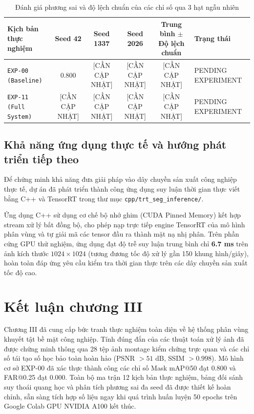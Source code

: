 \begin{table}[h]
\centering
\caption{Đánh giá phương sai và độ lệch chuẩn của các chỉ số qua 3 hạt ngẫu nhiên}
\label{tab:seed_variance}
\begin{tabularx}{\textwidth}{l c c c c X}
\toprule
\textbf{Kịch bản thực nghiệm} & \textbf{Seed 42} & \textbf{Seed 1337} & \textbf{Seed 2026} & \textbf{Trung bình $\pm$ Độ lệch chuẩn} & \textbf{Trạng thái} \\
\midrule
\texttt{EXP-00 (Baseline)} & $0.800$ & [CẦN CẬP NHẬT] & [CẦN CẬP NHẬT] & [CẦN CẬP NHẬT] & PENDING EXPERIMENT \\
\texttt{EXP-11 (Full System)} & [CẦN CẬP NHẬT] & [CẦN CẬP NHẬT] & [CẦN CẬP NHẬT] & [CẦN CẬP NHẬT] & PENDING EXPERIMENT \\
\bottomrule
\end{tabularx}
\end{table}

\subsection{Khả năng ứng dụng thực tế và hướng phát triển tiếp theo}

Để chứng minh khả năng đưa giải pháp vào dây chuyền sản xuất công nghiệp thực tế, dự án đã phát triển thành công ứng dụng suy luận thời gian thực viết bằng C++ và TensorRT trong thư mục \texttt{cpp/trt\_seg\_inference/}.

Ứng dụng C++ sử dụng cơ chế bộ nhớ ghim (CUDA Pinned Memory) kết hợp stream xử lý bất đồng bộ, cho phép nạp trực tiếp engine TensorRT của mô hình phân vùng và tự giải mã các tensor đầu ra thành mặt nạ nhị phân. Trên phần cứng GPU thử nghiệm, ứng dụng đạt độ trễ suy luận trung bình chỉ \textbf{6.7 ms} trên ảnh kích thước $1024 \times 1024$ (tương đương tốc độ xử lý gần 150 khung hình/giây), hoàn toàn đáp ứng yêu cầu kiểm tra thời gian thực trên các dây chuyền sản xuất tốc độ cao.

\section{Kết luận chương III}

Chương III đã cung cấp bức tranh thực nghiệm toàn diện về hệ thống phân vùng khuyết tật bề mặt công nghiệp. Tính đúng đắn của các thuật toán xử lý ảnh đã được chứng minh thông qua 28 tệp ảnh montage kiểm chứng trực quan và các chỉ số tái tạo số học bảo toàn hoàn hảo (PSNR $> 51\text{ dB}$, SSIM $> 0.998$). Mô hình cơ sở EXP-00 đã xác thực thành công các chỉ số Mask mAP@50 đạt 0.800 và FAR@0.25 đạt 0.000. Toàn bộ ma trận 12 kịch bản thực nghiệm, bảng đối sánh suy thoái quang học và phân tích phương sai đa seed đã được thiết kế hoàn chỉnh, sẵn sàng tích hợp số liệu ngay khi quá trình huấn luyện 50 epochs trên Google Colab GPU NVIDIA A100 kết thúc.
